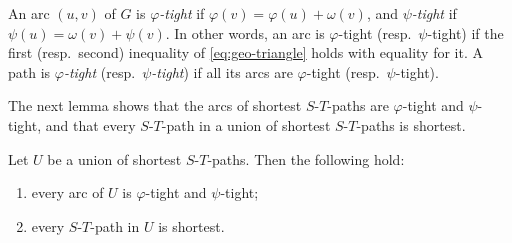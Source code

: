 \documentclass[fontsize=12pt,leading=14pt]{fullpaper}
\begin{document}
\begin{definition}\label{def:tight}
  An arc $(u,v)$ of $G$ is \emph{$\varphi$-tight} if $\varphi(v)=\varphi(u)+\omega(v)$, and \emph{$\psi$-tight} if $\psi(u)=\omega(v)+\psi(v)$.
  In other words, an arc is $\varphi$-tight (resp.\ $\psi$-tight) if the first (resp.\ second) inequality of \eqref{eq:geo-triangle} holds with equality for it.
  A path is \emph{$\varphi$-tight} (resp.\ \emph{$\psi$-tight}) if all its arcs are $\varphi$-tight (resp.\ $\psi$-tight).
\end{definition}

The next lemma shows that the arcs of shortest $S$-$T$-paths are $\varphi$-tight and $\psi$-tight, and that every $S$-$T$-path in a union of shortest $S$-$T$-paths is shortest.

\begin{lemma}\label{lem:shortest}
  Let $U$ be a union of shortest $S$-$T$-paths.
  Then the following hold:
  \begin{enumerate}[label=\textnormal{(\roman*)}]
    \item\label{item:shortest-tight} every arc of $U$ is $\varphi$-tight and $\psi$-tight;
    \item\label{item:shortest-union} every $S$-$T$-path in $U$ is shortest.
  \end{enumerate}
\end{lemma}
\end{document}
